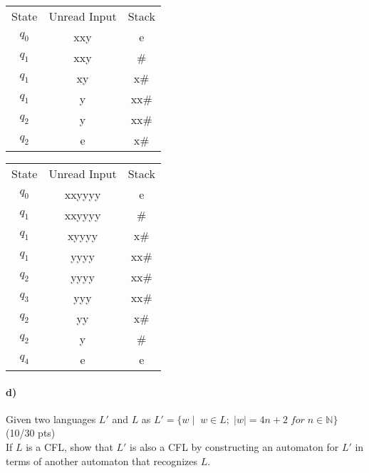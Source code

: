 \documentclass[a4paper,12pt]{article}
\begin{document}
\begin{tcolorbox}
\begin{center}
\begin{tikzpicture}[scale=0.2]
\end{tikzpicture}
\end{center}
\begin{minipage}{0.45\textwidth}
\begin{tabular}{c|c|c}
     State & Unread Input & Stack  \\
     $q_0$& xxy & e\\
     $q_1$&xxy&\#\\
     $q_1$&xy&x\#\\
     $q_1$&y&xx\#\\
     $q_2$&y&xx\#\\
     $q_2$&e&x\#
\end{tabular}
\end{minipage}
    \begin{minipage}{0.45\textwidth}
\begin{tabular}{c|c|c}
     State & Unread Input & Stack  \\
     $q_0$& xxyyyy & e\\
     $q_1$&xxyyyy&\#\\
     $q_1$&xyyyy&x\#\\
     $q_1$&yyyy&xx\#\\
     $q_2$&yyyy&xx\#\\
     $q_3$&yyy&xx\#\\
     $q_2$&yy&x\#\\
     $q_2$&y&\#\\
     $q_4$&e&e
\end{tabular}
\end{minipage}
\end{tcolorbox}

\paragraph{d)} Given two languages $L'$ and $L$ as $L'=\{w \mid \; w\in L; \; |w|=4n+2 \; for\; n\in \mathbb{N} \}$
\hfill \small{(10/30 pts)} \\
If $L$ is a CFL, show that $L'$ is also a CFL by constructing an automaton for $L'$ in terms of another automaton that recognizes $L$. \\
\end{document}
